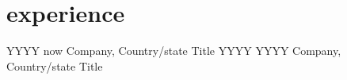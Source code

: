 \section{experience}
\begin{entrylist}
    \entry
    {YYYY now}
    {Company, Country/state}
    {Title}
    {\blinddescription[3]}
    \entry
    {YYYY YYYY}
    {Company, Country/state}
    {Title}
    {\blinddescription[2]}
\end{entrylist}
